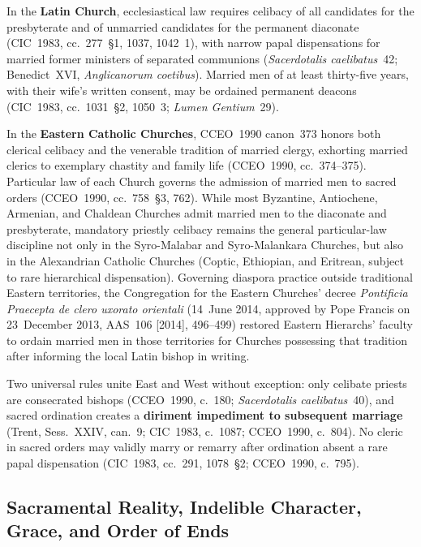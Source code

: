 In the \textbf{Latin Church}, ecclesiastical law requires celibacy of all candidates for the presbyterate and of unmarried candidates for the permanent diaconate (CIC~1983, cc.~277~\S1, 1037, 1042~1\textdegree), with narrow papal dispensations for married former ministers of separated communions (\emph{Sacerdotalis caelibatus}~42; Benedict~XVI, \emph{Anglicanorum coetibus}). Married men of at least thirty-five years, with their wife's written consent, may be ordained permanent deacons (CIC~1983, cc.~1031~\S2, 1050~3\textdegree; \emph{Lumen Gentium}~29).

In the \textbf{Eastern Catholic Churches}, CCEO~1990 canon~373 honors both clerical celibacy and the venerable tradition of married clergy, exhorting married clerics to exemplary chastity and family life (CCEO~1990, cc.~374--375). Particular law of each Church  governs the admission of married men to sacred orders (CCEO~1990, cc.~758~\S3, 762). While most Byzantine, Antiochene, Armenian, and Chaldean Churches admit married men to the diaconate and presbyterate, mandatory priestly celibacy remains the general particular-law discipline not only in the Syro-Malabar and Syro-Malankara Churches, but also in the Alexandrian Catholic Churches (Coptic, Ethiopian, and Eritrean, subject to rare hierarchical dispensation). Governing diaspora practice outside traditional Eastern territories, the Congregation for the Eastern Churches' decree \emph{Pontificia Praecepta de clero uxorato orientali} (14~June 2014, approved by Pope Francis on 23~December 2013, AAS~106 [2014], 496--499) restored Eastern Hierarchs' faculty to ordain married men in those territories for Churches possessing that tradition after informing the local Latin bishop in writing.

Two universal rules unite East and West without exception: only celibate priests are consecrated bishops (CCEO~1990, c.~180; \emph{Sacerdotalis caelibatus}~40), and sacred ordination creates a \textbf{diriment impediment to subsequent marriage} (Trent, Sess.~XXIV, can.~9; CIC~1983, c.~1087; CCEO~1990, c.~804). No cleric in sacred orders may validly marry or remarry after ordination absent a rare papal dispensation (CIC~1983, cc.~291, 1078~\S2; CCEO~1990, c.~795).

\subsection{Sacramental Reality, Indelible Character, Grace, and Order of Ends}
\label{subsec:orders-effects}

